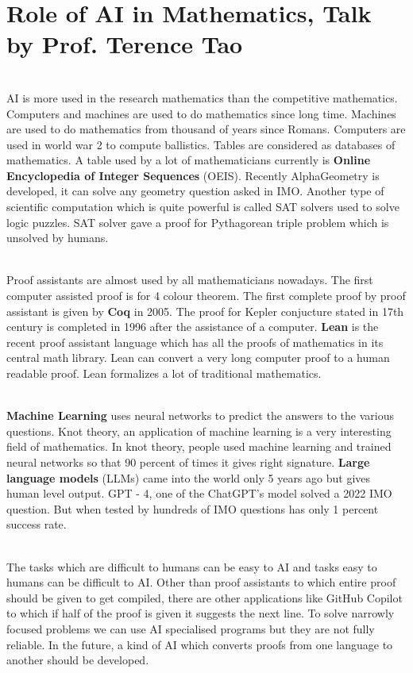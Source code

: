 \documentclass{article}
\begin{document}
\section{Role of AI in Mathematics, Talk by Prof. Terence Tao}
\begin{paragraph}
\\
AI is more used in the research mathematics than the competitive mathematics. Computers and machines are used to do mathematics since long time. Machines are used to do mathematics from thousand of years since Romans. Computers are used in world war 2 to compute ballistics. Tables are considered as databases of mathematics. A table used by a lot of mathematicians currently is \textbf{Online Encyclopedia of Integer Sequences} (OEIS). Recently AlphaGeometry is developed, it can solve any geometry question asked in IMO. Another type of scientific computation which is quite powerful is called SAT solvers used to solve logic puzzles. SAT solver gave a proof for Pythagorean triple problem which is unsolved by humans. 
\end{paragraph}
\begin{paragraph}
\\
Proof assistants are almost used by all mathematicians nowadays. The first computer assisted proof is for 4 colour theorem. The first complete proof by proof assistant is given by \textbf{Coq} in 2005. The proof for Kepler conjucture stated in 17th century is completed in 1996 after the assistance of a computer. \textbf{Lean} is the recent proof assistant language which has all the proofs of mathematics in its central math library. Lean can convert a very long computer proof to a human readable proof. Lean formalizes a lot of traditional mathematics.
\end{paragraph}
\begin{paragraph}
\\
\textbf{Machine Learning} uses neural networks to predict the answers to the various questions. Knot theory, an application of machine learning is a very interesting field of mathematics. In knot theory, people used machine learning and trained neural networks so that 90 percent of times it gives right signature. \textbf{Large language models} (LLMs) came into the world only 5 years ago but gives human level output. GPT - 4, one of the ChatGPT's model solved a 2022 IMO question. But when tested by hundreds of IMO questions has only 1 percent success rate. 
\end{paragraph}
\begin{paragraph}
\\
The tasks which are difficult to humans can be easy to AI and tasks easy to humans can be difficult to AI. Other than proof assistants to which entire proof should be given to get compiled, there are other applications like GitHub Copilot to which if half of the proof is given it suggests the next line. To solve narrowly focused problems we can use AI specialised programs but they are not fully reliable. In the future, a kind of AI which converts proofs from one language to another should be developed.
\end{paragraph}
\end{document}
